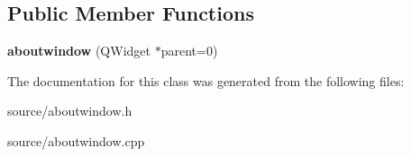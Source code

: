 \subsection*{Public Member Functions}
\begin{DoxyCompactItemize}
\item 
\hypertarget{classaboutwindow_a27a819aa0351428d684b12827130f78e}{}{\bfseries aboutwindow} (Q\+Widget $\ast$parent=0)\label{classaboutwindow_a27a819aa0351428d684b12827130f78e}

\end{DoxyCompactItemize}


The documentation for this class was generated from the following files\+:\begin{DoxyCompactItemize}
\item 
source/aboutwindow.\+h\item 
source/aboutwindow.\+cpp\end{DoxyCompactItemize}
